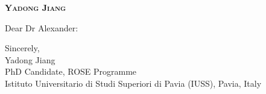 \documentclass{article}
\begin{document}
\begin{center}

    \Large\selectfont
    \textbf{\textsc{Yadong Jiang}}\\
    
    \normalsize\selectfont
    
    
    
\end{center}
\par


\normalsize\selectfont


\par
\vspace{15pt}

\large\selectfont

Dear Dr Alexander:
\par

\par
Sincerely,\\
Yadong Jiang\\
PhD Candidate, ROSE Programme\\
Istituto Universitario di Studi Superiori di Pavia (IUSS), Pavia, Italy
\end{document}
